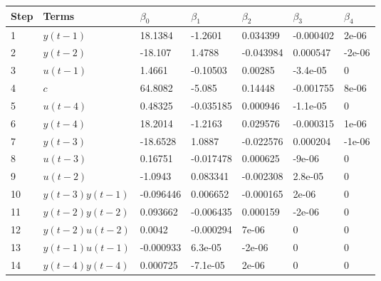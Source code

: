 \begin{tabular}{lllllll}
Step & Terms & $\beta_{0}$ & $\beta_{1}$ & $\beta_{2}$ & $\beta_{3}$ & $\beta_{4}$ \\ 
\hline 
1 & $y(t-1)$ & 18.1384 & -1.2601 & 0.034399 & -0.000402 & 2e-06 \\ 
2 & $y(t-2)$ & -18.107 & 1.4788 & -0.043984 & 0.000547 & -2e-06 \\ 
3 & $u(t-1)$ & 1.4661 & -0.10503 & 0.00285 & -3.4e-05 & 0 \\ 
4 & $c$ & 64.8082 & -5.085 & 0.14448 & -0.001755 & 8e-06 \\ 
5 & $u(t-4)$ & 0.48325 & -0.035185 & 0.000946 & -1.1e-05 & 0 \\ 
6 & $y(t-4)$ & 18.2014 & -1.2163 & 0.029576 & -0.000315 & 1e-06 \\ 
7 & $y(t-3)$ & -18.6528 & 1.0887 & -0.022576 & 0.000204 & -1e-06 \\ 
8 & $u(t-3)$ & 0.16751 & -0.017478 & 0.000625 & -9e-06 & 0 \\ 
9 & $u(t-2)$ & -1.0943 & 0.083341 & -0.002308 & 2.8e-05 & 0 \\ 
10 & $y(t-3)y(t-1)$ & -0.096446 & 0.006652 & -0.000165 & 2e-06 & 0 \\ 
11 & $y(t-2)y(t-2)$ & 0.093662 & -0.006435 & 0.000159 & -2e-06 & 0 \\ 
12 & $y(t-2)u(t-2)$ & 0.0042 & -0.000294 & 7e-06 & 0 & 0 \\ 
13 & $y(t-1)u(t-1)$ & -0.000933 & 6.3e-05 & -2e-06 & 0 & 0 \\ 
14 & $y(t-4)y(t-4)$ & 0.000725 & -7.1e-05 & 2e-06 & 0 & 0 \\ 
\hline 
\end{tabular}